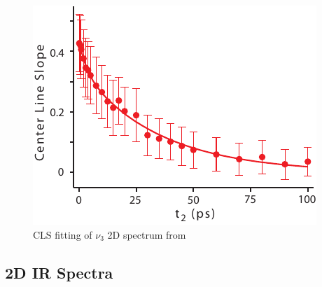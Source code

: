 {\begin{figure}[h]
  \centering
  \includegraphics[scale=1]{./paper_01/CLS_fit_BMIMTFA.pdf}
  \caption{CLS fitting of  \(\nu_3\) 2D spectrum from \ce{[Im_{4,1}][TFA]}}
\end{figure}

\subsection{2D IR Spectra}
\label{anionSI_2D}

}
